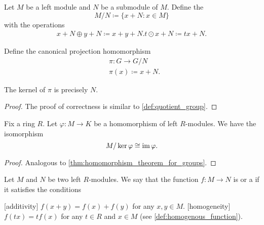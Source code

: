 \begin{definition}\label{def:quotient_left_module}
  Let \( M \) be a left module and \( N \) be a submodule of \( M \). Define the 
  \begin{equation*}
    M / N \coloneqq \{ x + N \colon x \in M \}
  \end{equation*}
  with the operations
  \begin{align*}
    x + N \oplus y + N \coloneqq x + y + N.
    t \odot x + N \coloneqq tx + N.
  \end{align*}

  Define the canonical projection homomorphism
  \begin{align*}
    &\pi: G \to G / N \\
    &\pi(x) \coloneqq x + N.
  \end{align*}

  The kernel of \( \pi \) is precisely \( N \).
\end{definition}
\begin{proof}
  The proof of correctness is similar to \cref{def:quotient_group}.
\end{proof}

\begin{theorem}\label{thm:homomorphism_theorem_for_left_modules}
  Fix a ring \( R \). Let \( \varphi: M \to K \) be a homomorphism of left \( R \)-modules. We have the isomorphism
  \begin{equation*}
    M / \ker \varphi \cong \operatorname{im} \varphi.
  \end{equation*}
\end{theorem}
\begin{proof}
  Analogous to \cref{thm:homomorphism_theorem_for_groups}.
\end{proof}

\begin{definition}\label{def:linear_operator}
  Let \( M \) and \( N \) be two left \( R \)-modules. We say that the function \( f: M \to N \) is  or a  if it satisfies the conditions
  \begin{defenum}
    [additivity] \( f(x + y) = f(x) + f(y) \) for any \( x, y \in M \).
    [homogeneity] \( f(tx) = t f(x) \) for any \( t \in R \) and \( x \in M \) (see \cref{def:homogenous_function}).
  \end{defenum}
\end{definition}

